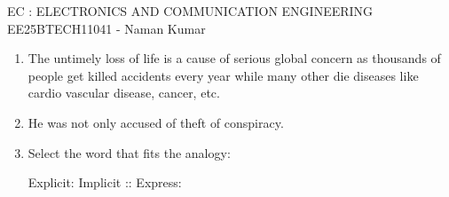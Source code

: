 \documentclass[a4paper, 11pt]{article}
\begin{document}
\begin{center}
    \huge{EC : ELECTRONICS AND COMMUNICATION ENGINEERING}\\
    \large{EE25BTECH11041 - Naman Kumar}
\end{center}

\begin{enumerate}
    \section*{General Aptitude (GA)}
    \item The untimely loss of life is a cause of serious global concern as thousands of people get killed \underline{\hspace{2cm}} accidents every year while many other die \underline{\hspace{2cm}} diseases like cardio vascular disease, cancer, etc.
    \begin{enumerate}
    \end{enumerate}

    \hfill{}

    \item He was not only accused of theft \underline{\hspace{2cm}} of conspiracy.
    \begin{enumerate}
    \end{enumerate}

    \hfill{}

    \item Select the word that fits the analogy:
    
    Explicit: Implicit :: Express: \underline{\hspace{2cm}}
    \begin{enumerate}
    \end{enumerate}


\end{enumerate}
\end{document}

